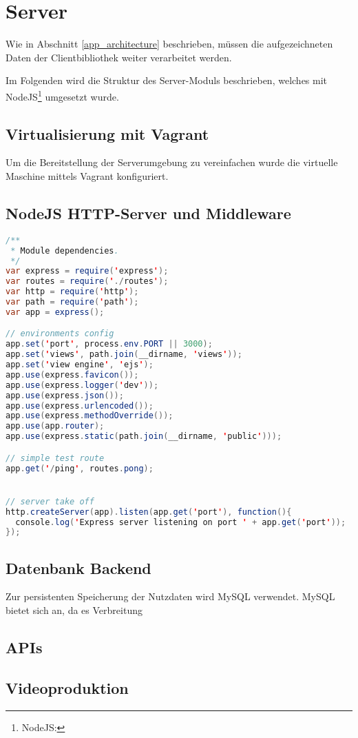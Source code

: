 \section{Server}
\label{server}
Wie in Abschnitt \ref{app_architecture} beschrieben, müssen die aufgezeichneten Daten der Clientbibliothek weiter verarbeitet werden. %

Im Folgenden wird die Struktur des Server-Moduls beschrieben, welches mit NodeJS\footnote{NodeJS: } umgesetzt wurde.

\subsection{Virtualisierung mit Vagrant}
Um die Bereitstellung der Serverumgebung zu vereinfachen wurde die virtuelle Maschine mittels Vagrant konfiguriert. 

\subsection{NodeJS HTTP-Server und Middleware}

\begin{lstlisting}[label=minimal_node_http_server,language=Java, caption=Minimaler Node-HTTP-Server]
/**
 * Module dependencies.
 */
var express = require('express');
var routes = require('./routes');
var http = require('http');
var path = require('path');
var app = express();

// environments config
app.set('port', process.env.PORT || 3000);
app.set('views', path.join(__dirname, 'views'));
app.set('view engine', 'ejs');
app.use(express.favicon());
app.use(express.logger('dev'));
app.use(express.json());
app.use(express.urlencoded());
app.use(express.methodOverride());
app.use(app.router);
app.use(express.static(path.join(__dirname, 'public')));

// simple test route
app.get('/ping', routes.pong);


// server take off
http.createServer(app).listen(app.get('port'), function(){
  console.log('Express server listening on port ' + app.get('port'));
});
\end{lstlisting}



\subsection{Datenbank Backend}

Zur persistenten Speicherung der Nutzdaten wird MySQL verwendet. MySQL bietet sich an, da es Verbreitung %

\subsection{APIs}

\subsection{Videoproduktion}

